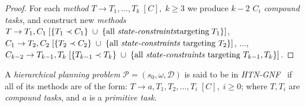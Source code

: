 \begin{proof}
    For each \emph{method} $T \rightarrow T_1, \dots, T_k \; [C], \; k \geq 3$ we produce $k - 2$ $C_i$ \emph{compound tasks}, and construct new \emph{methods} $T \rightarrow T_1, C_1 \; [\{T_1 \prec C_1\} \; \cup \; \{\text{all \emph{state-constraints}} \\ \text{targeting} \; T_1\}]$, $C_1 \rightarrow T_2, C_2 \; [\{T_2 \prec C_2\} \; \cup \; \{\text{all \emph{state-constraints} targeting $T_2$}\}]$, $\dots$, $C_{k-2} \rightarrow T_{k-1}, T_k \; [\{T_{k-1} \prec T_k\} \; \cup \; \{\text{all \emph{state-constraints} targeting $T_{k-1}, T_k$}\}]$.
\end{proof}

\begin{defn}\label{def04:18}
    A \emph{hierarchical planning problem} $\mathcal{P} = (s_0,\omega,\mathcal{D})$ is said to be in \emph{HTN-GNF~\cite{gnf}} if all of its methods are of the form: $T \rightarrow a, T_1, T_2, \dots, T_i \; [C], \; i \geq 0$; where $T, T_i$ are \emph{compound tasks}, and $a$ is a \emph{primitive task}. 
\end{defn}

